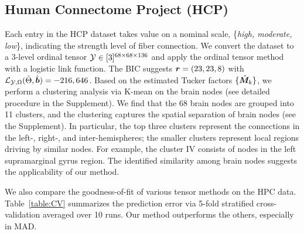 \documentclass{article}
\theoremstyle{plain}
\theoremstyle{definition}
\begin{document}
\subsection{Human Connectome Project (HCP)}
Each entry in the HCP dataset takes value on a nominal scale, \{{\it high, moderate, low}\}, indicating the strength level of fiber connection. We convert the dataset to a 3-level ordinal tensor $\mathcal{Y}\in[3]^{68\times 68\times 136}$ and apply the ordinal tensor method with a logistic link function. The BIC suggests $\bm{r} = (23,23,8)$ with $\mathcal{L}_{\mathcal{Y},\Omega}(\hat{\Theta},\hat{\bm{b}}) = -216,646$. Based on the estimated Tucker factors $\{\hat {\bm M}_k\}$, we perform a clustering analysis via K-mean on the brain nodes (see detailed procedure in the Supplement). We find that the 68 brain nodes are grouped into 11 clusters, and the clustering captures the spatial separation of brain nodes (see the Supplement). In particular, the top three clusters represent the connections in the left-, right-, and inter-hemispheres; the smaller clusters represent local regions driving by similar nodes. For example, the cluster IV consists of nodes in the left supramarginal gyrus region. The identified similarity among brain nodes suggests the applicability of our method.

We also compare the goodness-of-fit of various tensor methods on the HPC data. Table~\ref{table:CV} summarizes the prediction error via 5-fold stratified cross-validation averaged over 10 runs. Our method outperforms the others, especially in MAD.

\begin{table}[http]
\vspace{-.2cm}
\caption{Comparison of prediction error in the HPC and InCarMusic analyses. Standard errors are reported in parentheses.}\label{table:CV}
\vspace{-.3cm}
\end{table}
\end{document}
